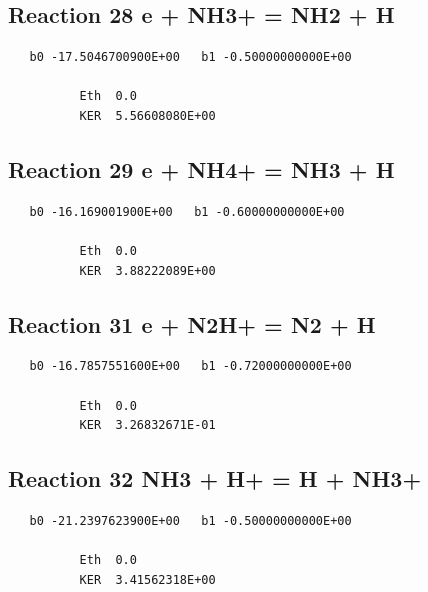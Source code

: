 \documentclass[12pt]{article}
\begin{document}
\subsection{
Reaction 28 e + NH3+ = NH2 + H }
\begin{small}\begin{verbatim}
   b0 -17.5046700900E+00   b1 -0.50000000000E+00

          Eth  0.0
          KER  5.56608080E+00

\end{verbatim}\end{small}
\newpage

\subsection{
Reaction 29 e + NH4+ = NH3 + H }
\begin{small}\begin{verbatim}
   b0 -16.169001900E+00   b1 -0.60000000000E+00

          Eth  0.0
          KER  3.88222089E+00

\end{verbatim}\end{small}
\newpage

\subsection{
Reaction 31 e + N2H+ = N2 + H }
\begin{small}\begin{verbatim}
   b0 -16.7857551600E+00   b1 -0.72000000000E+00

          Eth  0.0
          KER  3.26832671E-01

\end{verbatim}\end{small}
\newpage

\subsection{
Reaction 32 NH3 + H+ = H + NH3+ }
\begin{small}\begin{verbatim}
   b0 -21.2397623900E+00   b1 -0.50000000000E+00

          Eth  0.0
          KER  3.41562318E+00

\end{verbatim}\end{small}
\newpage
\end{document}
